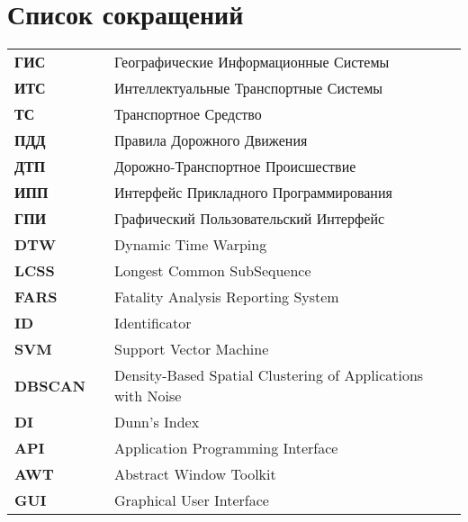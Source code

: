 \section*{Список сокращений}
\label{ch:Список сокращений}

\begin{tabular}{lll}
	\\
	\textbf{ГИС}        & & {Географические Информационные Системы} \\[0.5ex]
	\textbf{ИТС}        & & {Интеллектуальные Транспортные Системы} \\[0.5ex]
	\textbf{ТС}         & & {Транспортное Средство} \\[0.5ex]
	\textbf{ПДД}        & & {Правила Дорожного Движения} \\[0.5ex]
	\textbf{ДТП}        & & {Дорожно-Транспортное Происшествие} \\[0.5ex]
	\textbf{ИПП}        & & {Интерфейс Прикладного Программирования} \\[0.5ex]
	\textbf{ГПИ}        & & {Графический Пользовательский Интерфейс} \\[0.5ex]
	\textbf{DTW}        & & {Dynamic Time Warping} \\[0.5ex]
	\textbf{LCSS}       & & {Longest Common SubSequence} \\[0.5ex]
	\textbf{FARS}       & & {Fatality Analysis Reporting System} \\[0.5ex]
	\textbf{ID}			& & {Identificator} \\[0.5ex]
	\textbf{SVM}		& & {Support Vector Machine} \\[0.5ex]
	\textbf{DBSCAN}		& & {Density-Based Spatial Clustering of Applications with Noise} \\[0.5ex]
	\textbf{DI}			& & {Dunn's Index} \\[0.5ex]
	\textbf{API}		& & {Application Programming Interface} \\[0.5ex]	
	\textbf{AWT}		& & {Abstract Window Toolkit} \\[0.5ex]
	\textbf{GUI}		& & {Graphical User Interface} \\[0.5ex]
	
\end{tabular}
